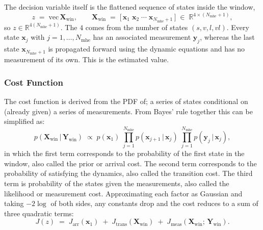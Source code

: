\documentclass{article}
\begin{document}
The decision variable itself is the flattened sequence of states inside the window,
\begin{equation}
    z \;=\; \mathrm{vec}\,\mathbf{X}_{\text{win}},
    \qquad
    \mathbf{X}_{\text{win}} \;=\; \bigl[\,\mathbf{x}_{1}\;\mathbf{x}_{2}\;\cdots\;\mathbf{x}_{N_{\text{mhe}}+1}\,\bigr] \;\in\; \mathbb{R}^{4\times(N_{\text{mhe}}+1)},
    \label{eq:est_decision}
\end{equation}
so $z\in\mathbb{R}^{4(N_{\text{mhe}}+1)}$. The $4$ comes from the number of states $(s,v,l,vl)$. Every state $\mathbf{x}_{j}$ with $j = 1,\ldots,N_{\text{mhe}}$ has an associated measurement $\mathbf{y}_{j}$, whereas the last state $\mathbf{x}_{N_{\text{mhe}}+1}$ is propagated forward using the dynamic equations and has no measurement of its own. This is the estimated value. 

\subsubsection{Cost Function}
\label{subsubsec:est_cost}

The cost function is derived from the PDF of; a series of states conditional on (already given) a series of measurements. From Bayes' rule together this can be simplified as:
\begin{equation}
    p(\mathbf{X}_{\text{win}}\,|\,\mathbf{Y}_{\text{win}})
    \;\propto\;
    p(\mathbf{x}_{1})
    \;\prod_{j=1}^{N_{\text{mhe}}} p(\mathbf{x}_{j+1}\,|\,\mathbf{x}_{j})
    \;\prod_{j=1}^{N_{\text{mhe}}} p(\mathbf{y}_{j}\,|\,\mathbf{x}_{j}),
    \label{eq:posterior_factor}
\end{equation}
in which the first term corresponds to the probability of the first state in the window, also called the prior or arrival cost. The second term corresponds to the probability of satisfying the dynamics, also called the transition cost. The third term is probability of the states given the measurements, also called the likelihood or measurement cost. Approximating each factor as Gaussian and taking $-2\log$ of both sides, any constants drop and the cost reduces to a sum of three quadratic terms:
\begin{equation}
    J(z) \;=\; J_{\text{arr}}(\mathbf{x}_{1}) \;+\; J_{\text{trans}}(\mathbf{X}_{\text{win}}) \;+\; J_{\text{meas}}(\mathbf{X}_{\text{win}};\,\mathbf{Y}_{\text{win}}).
    \label{eq:cost_total}
\end{equation}
\end{document}
